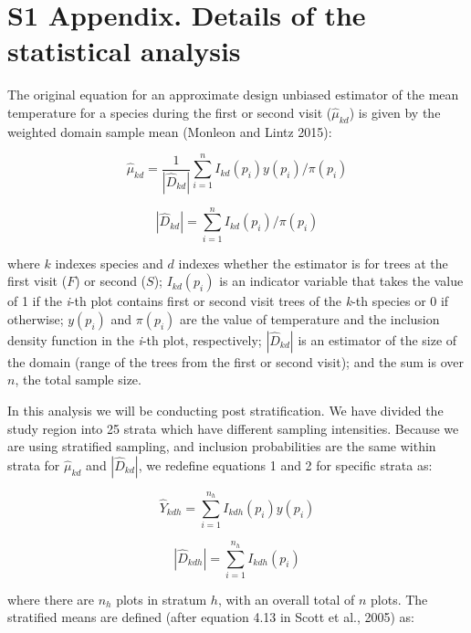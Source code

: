 \documentclass[12pt]{article}
\begin{document}
\pagestyle{plain}

\section*{S1 Appendix.  Details of the statistical analysis}

The original equation for an approximate design unbiased estimator of the mean temperature for a species during the first or second visit ($\hat{\mu}_{kd}$) is given by the weighted domain sample mean (Monleon and Lintz 2015):

\begin{equation}
\hat{\mu}_{kd} = \frac{1}{|\hat{D}_{kd}|}\displaystyle\sum_{i=1}^{n} I_{kd}(p_i)y(p_i)/\pi(p_i)  
\end{equation} 

\begin{equation}
|\hat{D}_{kd}| = \displaystyle\sum_{i=1}^{n} I_{kd}(p_i)/\pi(p_i)  
\end{equation} 

where $k$ indexes species and $d$ indexes whether the estimator is for trees at the first visit ($F$) or second ($S$); $I_{kd}(p_i)$ is an indicator variable that takes the value of 1 if the \emph{i}-th plot contains first or second visit trees of the \emph{k}-th species or 0 if otherwise; $y(p_i)$ and $\pi(p_i)$ are the value of temperature and the inclusion density function in the \emph{i}-th plot, respectively; $|\hat{D}_{kd}|$ is an estimator of the size of the domain (range of the trees from the first or second visit); and the sum is over $n$, the total sample size.

In this analysis we will be conducting post stratification.  We have divided the study region into 25 strata which have different sampling intensities.  Because we are using stratified sampling, and inclusion probabilities are the same within strata for $\hat{\mu}_{kd}$ and $|\hat{D}_{kd}|$, we redefine equations 1 and 2 for specific strata as: 

\begin{equation}
\hat{Y}_{kdh} = \displaystyle\sum_{i=1}^{n_h} I_{kdh}(p_i)y(p_i)  
\end{equation} 

\begin{equation}
|\hat{D}_{kdh}| = \displaystyle\sum_{i=1}^{n_h} I_{kdh}(p_i)
\end{equation} 

where there are $n_h$ plots in stratum $h$, with an overall total of $n$ plots.  The stratified means are defined (after equation 4.13 in Scott et al., 2005) as: 
\end{document}
